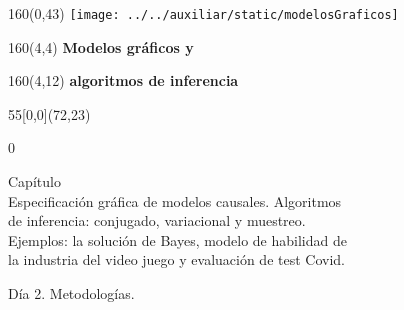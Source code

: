 \documentclass[shownotes,aspectratio=169]{beamer}
\newcounter{capitulo}
\newcommand{\unidad}{\thecapitulo \stepcounter{capitulo}}
\begin{document}
\begin{frame}
\begin{textblock}{160}(0,43)
\texttt{[image: ../../auxiliar/static/modelosGraficos]}
\end{textblock}


\begin{textblock}{160}(4,4)
\LARGE \textcolor{black!85}{\fontsize{22}{0}\selectfont \textbf{Modelos gráficos y}}
\end{textblock}
\begin{textblock}{160}(4,12)
\LARGE \textcolor{black!85}{\fontsize{22}{0}\selectfont \textbf{algoritmos de inferencia}}
\end{textblock}


\begin{textblock}{55}[0,0](72,23)
\begin{turn}{0}
\parbox{10cm}{\sloppy\setlength\parfillskip{0pt}
\textcolor{black!85}{Capítulo \unidad} \\
\small\textcolor{black!85}{Especificación gráfica de modelos causales. Algoritmos } \\
\small\textcolor{black!85}{de inferencia: conjugado, variacional y muestreo.} \\
\small\textcolor{black!85}{Ejemplos: la solución de Bayes, modelo de habilidad de} \\
\small\textcolor{black!85}{la industria del video juego y evaluación de test Covid.}\\
}
\end{turn}
\end{textblock}

\end{frame}

\begin{frame}

\centering \LARGE
Día 2. Metodologías.

\end{frame}
\end{document}
